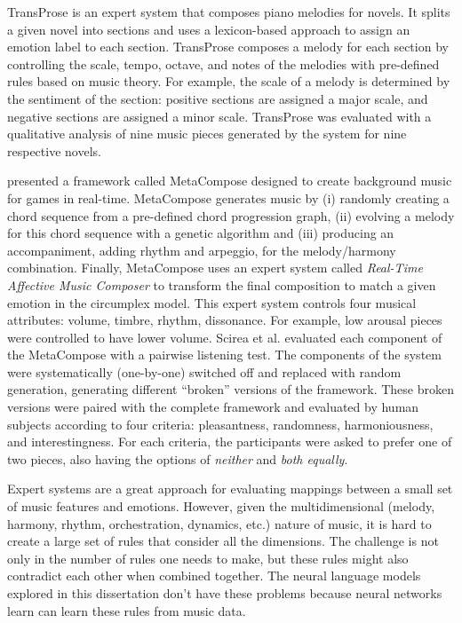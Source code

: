 TransProse \cite{davis2014generating} is an expert system that composes piano melodies for novels. It splits a given novel into sections and uses a lexicon-based approach to assign an emotion label to each section. TransProse composes a melody for each section by controlling the scale, tempo, octave, and notes of the melodies with pre-defined rules based on music theory. For example, the scale of a melody is determined by the sentiment of the section: positive sections are assigned a major scale, and negative sections are assigned a minor scale. TransProse was evaluated with a qualitative analysis of nine music pieces generated by the system for nine respective novels.

\citet{scirea2017affective} presented a framework called MetaCompose designed to create background music for games in real-time. MetaCompose generates music by (i) randomly creating a chord sequence from a pre-defined chord progression graph, (ii) evolving a melody for this chord sequence with a genetic algorithm and (iii) producing an accompaniment, adding rhythm and arpeggio, for the melody/harmony combination. Finally, MetaCompose uses an expert system called \textit{Real-Time Affective Music Composer} to transform the final composition to match a given emotion in the circumplex model. This expert system controls four musical attributes: volume, timbre, rhythm, dissonance. For example, low arousal pieces were controlled to have lower volume. Scirea et al. \cite{scirea2017affective} evaluated each component of the MetaCompose with a pairwise listening test. The components of the system were systematically (one-by-one) switched off and replaced with random generation, generating different ``broken'' versions of the framework. These broken versions were paired with the complete framework and evaluated by human subjects according to four criteria: pleasantness, randomness, harmoniousness, and interestingness. For each criteria, the participants were asked to prefer one of two pieces, also having the options of \textit{neither} and \textit{both equally}.

Expert systems are a great approach for evaluating mappings between a small set of music features and emotions. However, given the multidimensional (melody, harmony, rhythm, orchestration, dynamics, etc.) nature of music, it is hard to create a large set of rules that consider all the dimensions. The challenge is not only in the number of rules one needs to make, but these rules might also contradict each other when combined together. The neural language models explored in this dissertation don't have these problems because neural networks learn can learn these rules from music data.

